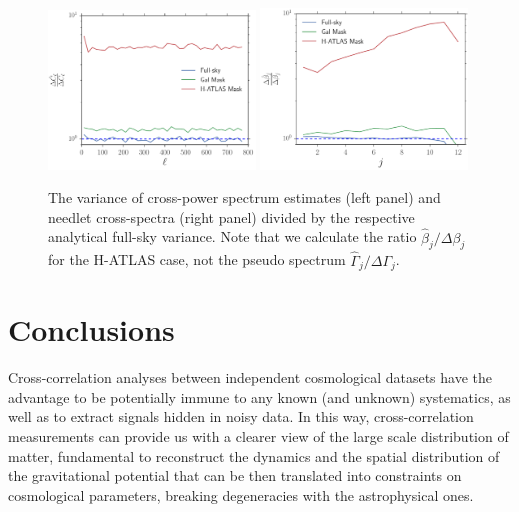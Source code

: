 \begin{figure}[tbp]
\centering %
\includegraphics[width=0.49\textwidth]{Chapter5/Images/variance_ratio_cl.pdf}
\includegraphics[width=0.49\textwidth]{Chapter5/Images/variance_ratio_needlet.pdf}
\caption{\label{fig:var_ratio} The variance of cross-power spectrum estimates (left panel) and needlet 
cross-spectra (right panel) divided by the respective analytical full-sky variance. Note that we calculate the 
ratio  $\hat{\beta}_j/\Delta\beta_j$ for the H-ATLAS case, not the pseudo spectrum $\hat{\Gamma}_j/\Delta
\Gamma_j$.}
\end{figure}
%

\section{Conclusions}
\label{sec:conclusion}
Cross-correlation analyses between independent cosmological datasets have the advantage to be 
potentially immune to any known (and unknown) systematics, as well as to extract signals hidden in noisy
data. In this way, cross-correlation measurements can provide us with a clearer view of the large scale 
distribution of matter, fundamental to reconstruct the dynamics and the spatial distribution of the 
gravitational potential that can be then translated into constraints on cosmological parameters, breaking
degeneracies with the astrophysical ones.

